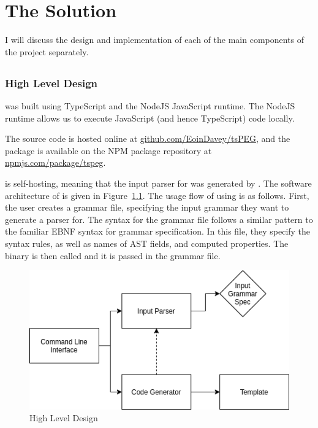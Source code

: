 \chapter{The Solution}

I will discuss the design and implementation of each of the main components of the project separately.

\section{\tsPEG{}}

\subsection{High Level Design}

\tsPEG{} was built using TypeScript and the NodeJS JavaScript runtime. The NodeJS runtime allows us to execute JavaScript (and hence TypeScript) code locally.

The source code is hosted online at
\href{https://github.com/EoinDavey/tsPEG}{github.com/EoinDavey/tsPEG}, and the \tsPEG{} package is available on the NPM package repository at \href{https://www.npmjs.com/package/tspeg}{npmjs.com/package/tspeg}.

\tsPEG{} is self-hosting, meaning that the input parser for \tsPEG{} was generated by \tsPEG{}. The software architecture of \tsPEG{} is given in Figure~\ref{tspegdiagram}. The usage flow of using \tsPEG{} is as follows. First, the user creates a grammar file, specifying the input grammar they want to generate a parser for. The syntax for the grammar file follows a similar pattern to the familiar EBNF syntax for grammar specification. In this file, they specify the syntax rules, as well as names of AST fields, and computed properties. The \tsPEG{} binary is then called and it is passed in the grammar file.

\begin{figure}
    \caption{\tsPEG{} High Level Design}
    \label{tspegdiagram}
    \begin{center}
    \includegraphics[scale=0.75]{tspegdiagram}
    \end{center}
\end{figure}

